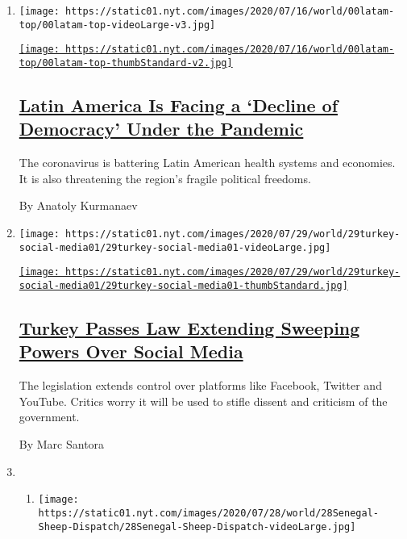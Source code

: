 \begin{enumerate}
\def\labelenumi{\arabic{enumi}.}
\item
  \texttt{[image: https://static01.nyt.com/images/2020/07/16/world/00latam-top/00latam-top-videoLarge-v3.jpg]}

  \href{/2020/07/29/world/americas/latin-america-democracy-pandemic.html}{\texttt{[image: https://static01.nyt.com/images/2020/07/16/world/00latam-top/00latam-top-thumbStandard-v2.jpg]}}

  \hypertarget{latin-america-is-facing-a-decline-of-democracy-under-the-pandemic}{%
  \subsection{\texorpdfstring{\href{/2020/07/29/world/americas/latin-america-democracy-pandemic.html}{Latin
  America Is Facing a `Decline of Democracy' Under the
  Pandemic}}{Latin America Is Facing a `Decline of Democracy' Under the Pandemic}}\label{latin-america-is-facing-a-decline-of-democracy-under-the-pandemic}}

  The coronavirus is battering Latin American health systems and
  economies. It is also threatening the region's fragile political
  freedoms.

  By Anatoly Kurmanaev
\item
  \texttt{[image: https://static01.nyt.com/images/2020/07/29/world/29turkey-social-media01/29turkey-social-media01-videoLarge.jpg]}

  \href{/2020/07/29/world/europe/turkey-social-media-control.html}{\texttt{[image: https://static01.nyt.com/images/2020/07/29/world/29turkey-social-media01/29turkey-social-media01-thumbStandard.jpg]}}

  \hypertarget{turkey-passes-law-extending-sweeping-powers-over-social-media}{%
  \subsection{\texorpdfstring{\href{/2020/07/29/world/europe/turkey-social-media-control.html}{Turkey
  Passes Law Extending Sweeping Powers Over Social
  Media}}{Turkey Passes Law Extending Sweeping Powers Over Social Media}}\label{turkey-passes-law-extending-sweeping-powers-over-social-media}}

  The legislation extends control over platforms like Facebook, Twitter
  and YouTube. Critics worry it will be used to stifle dissent and
  criticism of the government.

  By Marc Santora
\item
  \begin{enumerate}
  \def\labelenumii{\arabic{enumii}.}
  \item
    \texttt{[image: https://static01.nyt.com/images/2020/07/28/world/28Senegal-Sheep-Dispatch/28Senegal-Sheep-Dispatch-videoLarge.jpg]}


\end{enumerate}
\end{enumerate}

